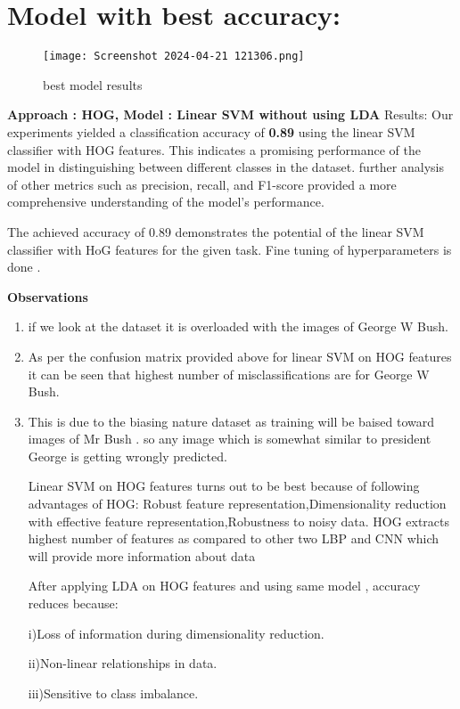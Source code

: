 \documentclass[a4paper]{article}
\theoremstyle{plain}
\theoremstyle{definition}
\begin{document}
\section{Model with best accuracy:}
\begin{figure}[htbp]
                \centering
                \texttt{[image: Screenshot 2024-04-21 121306.png]} %
                \caption{best model results}
                \label{fig:example}
                \end{figure}
\textbf{Approach : HOG, Model : Linear SVM without using LDA}
Results:
Our experiments yielded a classification accuracy of \textbf{0.89}
using the linear SVM classifier with HOG features. This indicates a promising performance of the model in distinguishing between different classes in the dataset.  further analysis of other metrics such as precision, recall, and F1-score  provided a more comprehensive understanding of the model's performance.

The achieved accuracy of 0.89 demonstrates the potential of the linear SVM classifier with HoG features for the given task. Fine tuning of hyperparameters is done . 
\vspace{8pt}

\textbf{Observations}
\begin{enumerate}
\item if we look at the dataset it is overloaded with the images of George W Bush.

\item As per the confusion matrix provided above for linear SVM on HOG features it can be seen that highest number of misclassifications are for George W Bush.

\item This is due to the biasing nature dataset as training will be baised toward images of Mr Bush . so any image which is somewhat similar to president George is getting wrongly predicted.

Linear SVM on HOG features turns out to be best because of following advantages of HOG: Robust feature representation,Dimensionality reduction with effective feature representation,Robustness to noisy data.
HOG extracts highest number of features as compared to other two LBP and CNN which will provide more information about data

After applying LDA on HOG features and using same model , accuracy reduces because:

i)Loss of information during dimensionality reduction.

ii)Non-linear relationships in data.

iii)Sensitive to class imbalance.
\end{enumerate}
\end{document}
